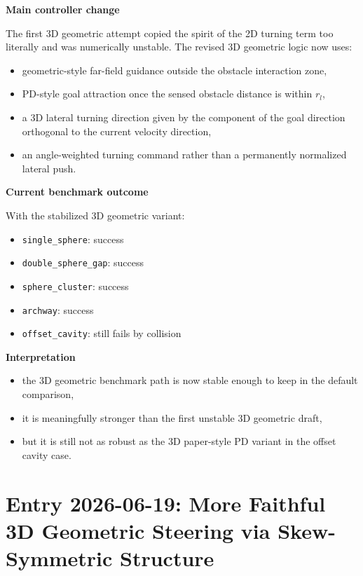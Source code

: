 \documentclass[11pt]{article}
\begin{document}
\textbf{Main controller change}

The first 3D geometric attempt copied the spirit of the 2D turning term too
literally and was numerically unstable. The revised 3D geometric logic now uses:

\begin{itemize}[leftmargin=*]
  \item geometric-style far-field guidance outside the obstacle interaction zone,
  \item PD-style goal attraction once the sensed obstacle distance is within $r_l$,
  \item a 3D lateral turning direction given by the component of the goal direction orthogonal to the current velocity direction,
  \item an angle-weighted turning command rather than a permanently normalized lateral push.
\end{itemize}

\textbf{Current benchmark outcome}

With the stabilized 3D geometric variant:

\begin{itemize}[leftmargin=*]
  \item \texttt{single\_sphere}: success
  \item \texttt{double\_sphere\_gap}: success
  \item \texttt{sphere\_cluster}: success
  \item \texttt{archway}: success
  \item \texttt{offset\_cavity}: still fails by collision
\end{itemize}

\textbf{Interpretation}

\begin{itemize}[leftmargin=*]
  \item the 3D geometric benchmark path is now stable enough to keep in the default comparison,
  \item it is meaningfully stronger than the first unstable 3D geometric draft,
  \item but it is still not as robust as the 3D paper-style PD variant in the offset cavity case.
\end{itemize}

\section*{Entry 2026-06-19: More Faithful 3D Geometric Steering via Skew-Symmetric Structure}
\end{document}
